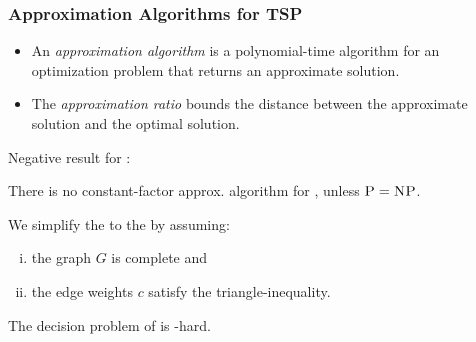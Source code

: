 \documentclass{beamer} %
\begin{document}
\begin{frame}
  \frametitle{Approximation Algorithms for TSP}

  \begin{itemize}
    \item An \textit{approximation algorithm} is a polynomial-time algorithm for an optimization problem that returns an approximate solution.
    \item The \textit{approximation ratio} bounds the distance between the approximate solution and the optimal solution.
  \end{itemize}
  \vspace*{0.5cm}
  \pause
  {\color{myred} Negative result for \TSP{}:}
  \begin{theorem}
    There is no constant-factor approx. algorithm for \TSP{}, unless $\textsc{P}=\textsc{NP}{}$.
  \end{theorem}
  \vspace*{0.5cm}
  \pause
  We simplify the \TSP{} to the \mTSP{} by assuming:
  \begin{enumerate}[(i)]
    \item the graph $G$ is complete and
    \item the edge weights $c$ satisfy the triangle-inequality.
  \end{enumerate}
  \vspace*{0.5cm}
  \pause
  \begin{theorem}
    The decision problem of \mTSP{} is \NP{}-hard.
  \end{theorem}

\end{frame}
\end{document}
